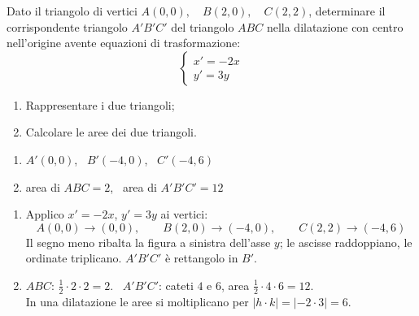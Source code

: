 
\begin{question}[ID=3.2, subtitle={Dilatazione con centro nell'origine sul triangolo $ABC$}, tags={trasformazioni geometriche, dilatazione}, difficulty=media]
Dato il triangolo di vertici $A(0,0), \quad B(2,0), \quad C(2,2)$, determinare il corrispondente triangolo $A'B'C'$ del triangolo $ABC$ nella dilatazione con centro nell'origine avente equazioni di trasformazione:
\[
\begin{cases}
x' = -2x \\
y' = 3y
\end{cases}
\]
\begin{enumerate}
\item Rappresentare i due triangoli;
\item Calcolare le aree dei due triangoli.
\end{enumerate}
\begin{solution}
\begin{enumerate}
    \item $A'(0,0)$, \ $B'(-4,0)$, \ $C'(-4,6)$
    \item area di $ABC=2$, \ area di $A'B'C'=12$
\end{enumerate}
\end{solution}
\begin{explanation}
\begin{enumerate}
    \item Applico $x'=-2x$, $y'=3y$ ai vertici:
    \[ A(0,0)\to(0,0), \qquad B(2,0)\to(-4,0), \qquad C(2,2)\to(-4,6) \]
    Il segno meno ribalta la figura a sinistra dell'asse $y$; le ascisse raddoppiano, le ordinate triplicano. $A'B'C'$ è rettangolo in $B'$.
    \item $ABC$: $\tfrac12\cdot2\cdot2=2$. \ $A'B'C'$: cateti $4$ e $6$, area $\tfrac12\cdot4\cdot6=12$. \\
    In una dilatazione le aree si moltiplicano per $|h\cdot k|=|-2\cdot3|=6$.
\end{enumerate}
\end{explanation}
\end{question}

